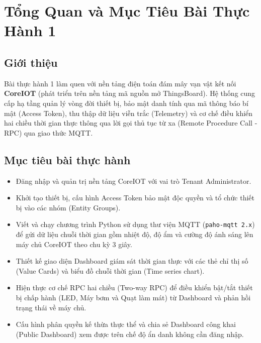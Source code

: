 \section{Tổng Quan và Mục Tiêu Bài Thực Hành 1}

\subsection{Giới thiệu}
Bài thực hành 1 làm quen với nền tảng điện toán đám mây vạn vật kết nối \textbf{CoreIOT} (phát triển trên nền tảng mã nguồn mở ThingsBoard). Hệ thống cung cấp hạ tầng quản lý vòng đời thiết bị, bảo mật danh tính qua mã thông báo bí mật (Access Token), thu thập dữ liệu viễn trắc (Telemetry) và cơ chế điều khiển hai chiều thời gian thực thông qua lời gọi thủ tục từ xa (Remote Procedure Call - RPC) qua giao thức MQTT.

\subsection{Mục tiêu bài thực hành}
\begin{itemize}
    \item Đăng nhập và quản trị nền tảng CoreIOT với vai trò Tenant Administrator.
    \item Khởi tạo thiết bị, cấu hình Access Token bảo mật độc quyền và tổ chức thiết bị vào các nhóm (Entity Groups).
    \item Viết và chạy chương trình Python sử dụng thư viện MQTT (\texttt{paho-mqtt 2.x}) để gửi dữ liệu chuỗi thời gian gồm nhiệt độ, độ ẩm và cường độ ánh sáng lên máy chủ CoreIOT theo chu kỳ 3 giây.
    \item Thiết kế giao diện Dashboard giám sát thời gian thực với các thẻ chỉ thị số (Value Cards) và biểu đồ chuỗi thời gian (Time series chart).
    \item Hiện thực cơ chế RPC hai chiều (Two-way RPC) để điều khiển bật/tắt thiết bị chấp hành (LED, Máy bơm và Quạt làm mát) từ Dashboard và phản hồi trạng thái về máy chủ.
    \item Cấu hình phân quyền kế thừa thực thể và chia sẻ Dashboard công khai (Public Dashboard) xem được trên chế độ ẩn danh không cần đăng nhập.
\end{itemize}

